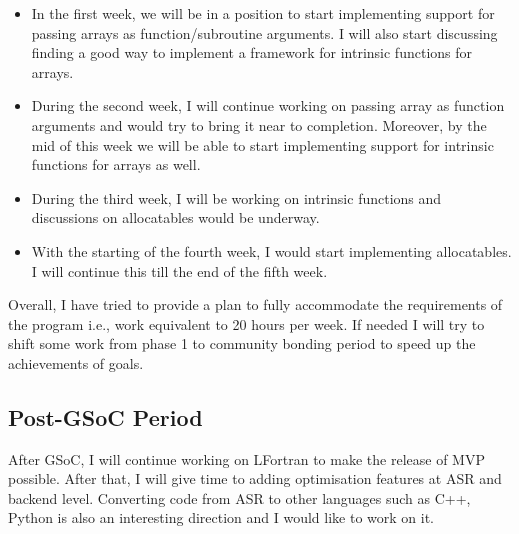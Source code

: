 \begin{itemize}

\item In the first week, we will be in a position to start implementing support for passing arrays as function/subroutine arguments. I will also start discussing finding a good way to implement a framework for intrinsic functions for arrays.

\item During the second week, I will continue working on passing array as function arguments and would try to bring it near to completion. Moreover, by the mid of this week we will be able to start implementing support for intrinsic functions for arrays as well.

\item During the third week, I will be working on intrinsic functions and discussions on allocatables would be underway.

\item With the starting of the fourth week, I would start implementing allocatables. I will continue this till the end of the fifth week.

\end{itemize}

Overall, I have tried to provide a plan to fully accommodate the requirements of the program i.e., work equivalent to 20 hours per week. If needed I will try to shift some work from phase 1 to community bonding period to speed up the achievements of goals.

\subsection{Post-GSoC Period}

After GSoC, I will continue working on LFortran to make the release of MVP possible. After that, I will give time to adding optimisation features at ASR and backend level. Converting code from ASR to other languages such as C++, Python is also an interesting direction and I would like to work on it.